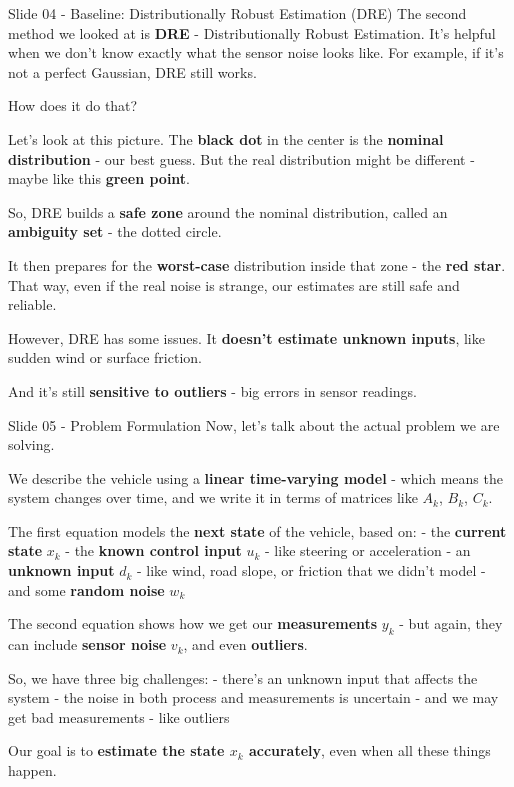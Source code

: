 \documentclass{beamer}
\begin{document}
\begin{frame}{Slide 04 - Baseline: Distributionally Robust Estimation
(DRE)}
\protect\hypertarget{slide-04---baseline-distributionally-robust-estimation-dre}{}
The second method we looked at is \textbf{DRE} - Distributionally Robust
Estimation. It's helpful when we don't know exactly what the sensor
noise looks like. For example, if it's not a perfect Gaussian, DRE still
works.

How does it do that?

Let's look at this picture. The \textbf{black dot} in the center is the
\textbf{nominal distribution} - our best guess. But the real
distribution might be different - maybe like this \textbf{green point}.

So, DRE builds a \textbf{safe zone} around the nominal distribution,
called an \textbf{ambiguity set} - the dotted circle.

It then prepares for the \textbf{worst-case} distribution inside that
zone - the \textbf{red star}. That way, even if the real noise is
strange, our estimates are still safe and reliable.

However, DRE has some issues. It \textbf{doesn't estimate unknown
inputs}, like sudden wind or surface friction.

And it's still \textbf{sensitive to outliers} - big errors in sensor
readings.
\end{frame}

\begin{frame}{Slide 05 - Problem Formulation}
\protect\hypertarget{slide-05---problem-formulation}{}
Now, let's talk about the actual problem we are solving.

We describe the vehicle using a \textbf{linear time-varying model} -
which means the system changes over time, and we write it in terms of
matrices like \(A_k\), \(B_k\), \(C_k\).

The first equation models the \textbf{next state} of the vehicle, based
on: - the \textbf{current state} \(x_k\) - the \textbf{known control
input} \(u_k\) - like steering or acceleration - an \textbf{unknown
input} \(d_k\) - like wind, road slope, or friction that we didn't model
- and some \textbf{random noise} \(w_k\)

The second equation shows how we get our \textbf{measurements} \(y_k\) -
but again, they can include \textbf{sensor noise} \(v_k\), and even
\textbf{outliers}.

So, we have three big challenges: - there's an unknown input that
affects the system - the noise in both process and measurements is
uncertain - and we may get bad measurements - like outliers

Our goal is to \textbf{estimate the state \(x_k\) accurately}, even when
all these things happen.
\end{frame}
\end{document}
